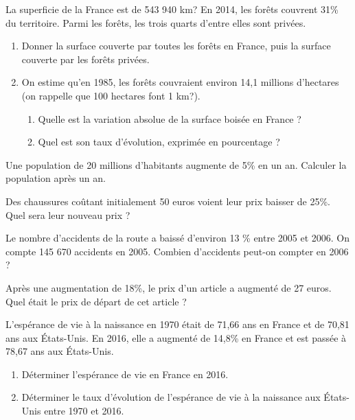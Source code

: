 {\newpage

\begin{Exercice} %

La superficie de la France est de 543 940 km? En 2014, les forêts couvrent 31\% du territoire.
Parmi les forêts, les trois quarts d'entre elles sont privées.
\begin{enumerate}
\item Donner la surface couverte par toutes les forêts en France, puis la surface couverte par les forêts privées.
\item On estime qu'en 1985, les forêts couvraient environ 14,1 millions d'hectares (on rappelle que 100 hectares font 1 km?).
\begin{enumerate}
\item Quelle est la variation absolue de la surface boisée en France ?
\item Quel est son taux d'évolution, exprimée en pourcentage ?
\end{enumerate}
\end{enumerate}
\end{Exercice}

\begin{Exercice} %

Une population de 20 millions d'habitants augmente de 5\% en un an. Calculer la population après un an.
\end{Exercice}

\begin{Exercice} %
Des chaussures coûtant initialement 50 euros voient leur prix baisser de 25\%. Quel sera leur
nouveau prix ?
\end{Exercice}

\begin{Exercice} %
Le nombre d'accidents de la route a baissé d'environ 13 \% entre 2005 et 2006. On compte 145
670 accidents en 2005. Combien d'accidents peut-on compter en 2006 ?
\end{Exercice}

\begin{Exercice} %
Après une augmentation de 18\%, le prix d'un article a augmenté de 27 euros. Quel était le prix de départ de cet article ?
\end{Exercice}

\begin{Exercice} %
L'espérance de vie à la naissance en 1970 était de 71,66 ans en France et de 70,81 ans aux États-Unis. En 2016, elle a augmenté de 14,8\% en France et est passée à 78,67 ans aux États-Unis.
\begin{enumerate}
\item Déterminer l'espérance de vie en France en 2016.
\item Déterminer le taux d'évolution de l'espérance de vie à la naissance aux États-Unis entre
1970 et 2016.
\end{enumerate}
\vspace{-0.7cm}
\end{Exercice}



}
